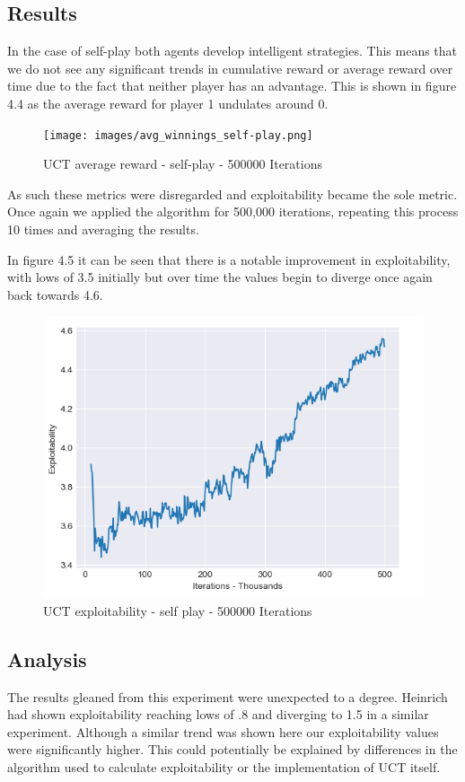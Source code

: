 \subsection{Results}\label{subsec:results2}
In the case of self-play both agents develop intelligent strategies.
This means that we do not see any significant trends in cumulative reward or average reward over time
due to the fact that neither player has an advantage.
This is shown in figure 4.4 as the average reward for player 1 undulates around 0.
\begin{figure}[ht]
    \texttt{[image: images/avg\_winnings\_self-play.png]}
    \caption{UCT average reward - self-play - 500000 Iterations}
\end{figure}
As such these metrics were disregarded and exploitability became the sole metric.
Once again we applied the algorithm for 500,000 iterations, repeating this process 10 times
and averaging the results.

In figure 4.5 it can be seen that there is a notable improvement in exploitability, with lows of 3.5 initially
but over time the values begin to diverge once again back towards 4.6.

\begin{figure}[ht]
    \includegraphics[scale=.7]{images/exploitability_self-play_deterministic_500000.png}
    \caption{UCT exploitability - self play - 500000 Iterations}
\end{figure}

\subsection{Analysis}\label{subsec:analysis2}
The results gleaned from this experiment were unexpected to a degree.
Heinrich had shown exploitability reaching lows of .8 and diverging to 1.5 in a similar experiment.
Although a similar trend was shown here our exploitability values were significantly higher.
This could potentially be explained by differences in the algorithm used to calculate exploitability
or the implementation of UCT itself.

